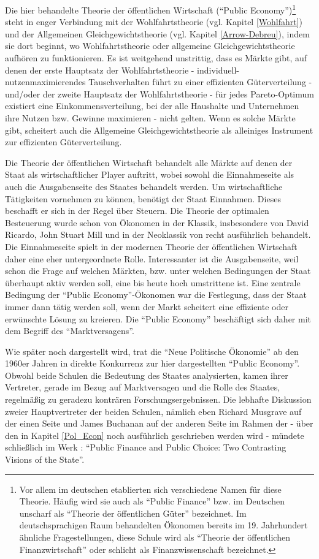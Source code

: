 Die hier behandelte Theorie der öffentlichen Wirtschaft ("`Public Economy"')\footnote{Vor allem im deutschen etablierten sich verschiedene Namen für diese Theorie. Häufig wird sie auch als "`Public Finance"' bzw. im Deutschen unscharf als "`Theorie der öffentlichen Güter"' bezeichnet. Im deutschsprachigen Raum behandelten Ökonomen bereits im 19. Jahrhundert ähnliche Fragestellungen, diese Schule wird als "`Theorie der öffentlichen Finanzwirtschaft"' oder schlicht als Finanzwissenschaft bezeichnet.} steht in enger Verbindung mit der Wohlfahrtstheorie (vgl. Kapitel \ref{Wohlfahrt}) und der Allgemeinen Gleichgewichtstheorie (vgl. Kapitel \ref{Arrow-Debreu}), indem sie dort beginnt, wo Wohlfahrtstheorie oder allgemeine Gleichgewichtstheorie aufhören zu funktionieren. Es ist weitgehend unstrittig, dass es Märkte gibt, auf denen der erste Hauptsatz der Wohlfahrtstheorie - individuell-nutzenmaximierendes Tauschverhalten führt zu einer effizienten Güterverteilung - und/oder der zweite Hauptsatz der Wohlfahrtstheorie - für jedes Pareto-Optimum existiert eine Einkommensverteilung, bei der alle Haushalte und Unternehmen ihre Nutzen bzw. Gewinne maximieren - nicht gelten. Wenn es solche Märkte gibt, scheitert auch die Allgemeine Gleichgewichtstheorie als alleiniges Instrument zur effizienten Güterverteilung.

Die Theorie der öffentlichen Wirtschaft behandelt alle Märkte auf denen der Staat als wirtschaftlicher Player auftritt, wobei sowohl die Einnahmeseite als auch die Ausgabenseite des Staates behandelt werden. Um wirtschaftliche Tätigkeiten vornehmen zu können, benötigt der Staat Einnahmen. Dieses beschafft er sich in der Regel über Steuern. Die Theorie der optimalen Besteuerung wurde schon von Ökonomen in der Klassik, insbesondere von David Ricardo, John Stuart Mill und in der Neoklassik von \textcite[Kapitel 38]{Walras1874} recht ausführlich behandelt. Die Einnahmeseite spielt in der modernen Theorie der öffentlichen Wirtschaft daher eine eher untergeordnete Rolle. Interessanter ist die Ausgabenseite, weil schon die Frage auf welchen Märkten, bzw. unter welchen Bedingungen der Staat überhaupt aktiv werden soll, eine bis heute hoch umstrittene ist. Eine zentrale Bedingung der "`Public Economy"'-Ökonomen war die Festlegung, dass der Staat immer dann tätig werden soll, wenn der Markt scheitert eine effiziente oder erwünschte Lösung zu kreieren. Die "`Public Economy"' beschäftigt sich daher mit dem Begriff des "`Marktversagens"'.

Wie später noch dargestellt wird, trat die "`Neue Politische Ökonomie"' ab den 1960er Jahren in direkte Konkurrenz zur hier dargestellten "`Public Economy"'. Obwohl beide Schulen die Bedeutung des Staates analysierten, kamen ihrer Vertreter, gerade im Bezug auf Marktversagen und die Rolle des Staates, regelmäßig zu geradezu konträren Forschungsergebnissen. Die lebhafte Diskussion zweier Hauptvertreter der beiden Schulen, nämlich eben Richard Musgrave auf der einen Seite und James Buchanan auf der anderen Seite im Rahmen der - über den in Kapitel \ref{Pol_Econ} noch ausführlich geschrieben werden wird - mündete schließlich im Werk \textcite{Musgrave1999}: "`Public Finance and Public Choice: Two Contrasting Visions of the State"'.

